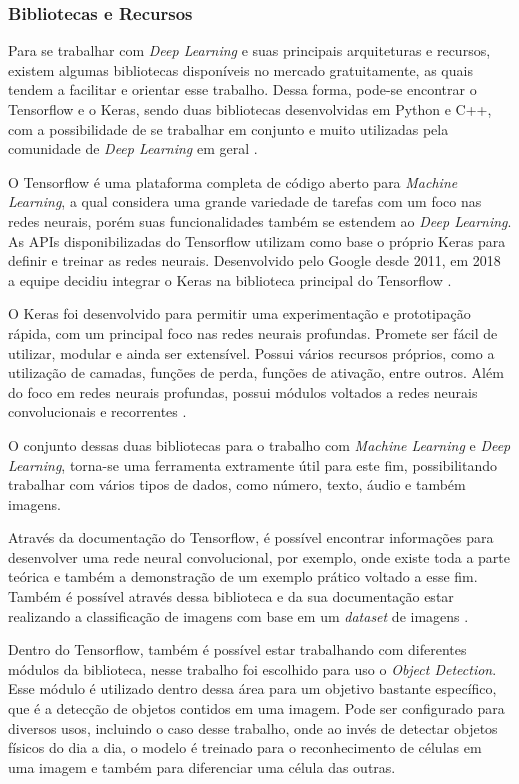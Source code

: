 \subsubsection{Bibliotecas e Recursos}
Para se trabalhar com \emph{Deep Learning} e suas principais arquiteturas e recursos, existem algumas bibliotecas disponíveis no mercado gratuitamente, as quais tendem a facilitar e orientar esse trabalho. Dessa forma, pode-se encontrar o Tensorflow e o Keras, sendo duas bibliotecas desenvolvidas em Python e C++, com a possibilidade de se trabalhar em conjunto e muito utilizadas pela comunidade de \emph{Deep Learning} em geral \cite{deepLearningTensorFlow}.

O Tensorflow é uma plataforma completa de código aberto para \emph{Machine Learning}, a qual considera uma grande variedade de tarefas com um foco nas redes neurais, porém suas funcionalidades também se estendem ao \emph{Deep Learning}. As APIs disponibilizadas do Tensorflow utilizam como base o próprio Keras para definir e treinar as redes neurais. Desenvolvido pelo Google desde 2011, em 2018 a equipe decidiu integrar o Keras na biblioteca principal do Tensorflow \cite{websiteTensorFlow}.

O Keras foi desenvolvido para permitir uma experimentação e prototipação rápida, com um principal foco nas redes neurais profundas. Promete ser fácil de utilizar, modular e ainda ser extensível. Possui vários recursos próprios, como a utilização de camadas, funções de perda, funções de ativação, entre outros. Além do foco em redes neurais profundas, possui módulos voltados a redes neurais convolucionais e recorrentes \cite{websiteKeras}.

O conjunto dessas duas bibliotecas para o trabalho com \emph{Machine Learning} e \emph{Deep Learning}, torna-se uma ferramenta extramente útil para este fim, possibilitando trabalhar com vários tipos de dados, como número, texto, áudio e também imagens.

Através da documentação do Tensorflow, é possível encontrar informações para desenvolver uma rede neural convolucional, por exemplo, onde existe toda a parte teórica e também a demonstração de um exemplo prático voltado a esse fim. Também é possível através dessa biblioteca e da sua documentação estar realizando a classificação de imagens com base em um \emph{dataset} de imagens \cite{websiteTensorFlow}.

Dentro do Tensorflow, também é possível estar trabalhando com diferentes módulos da biblioteca, nesse trabalho foi escolhido para uso o \emph{Object Detection}. Esse módulo é utilizado dentro dessa área para um objetivo bastante específico, que é a detecção de objetos contidos em uma imagem. Pode ser configurado para diversos usos, incluindo o caso desse trabalho, onde ao invés de detectar objetos físicos do dia a dia, o modelo é treinado para o reconhecimento de células em uma imagem e também para diferenciar uma célula das outras.

